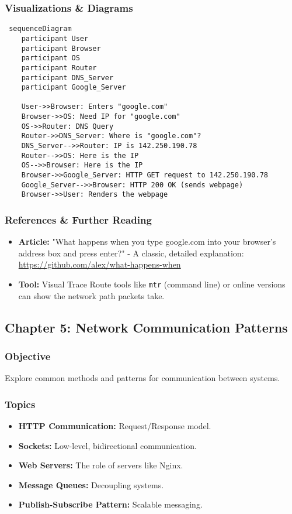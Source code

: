 \documentclass{article}
\begin{document}
\subsubsection{Visualizations \& Diagrams}
\begin{verbatim}
 sequenceDiagram
    participant User
    participant Browser
    participant OS
    participant Router
    participant DNS_Server
    participant Google_Server

    User->>Browser: Enters "google.com"
    Browser->>OS: Need IP for "google.com"
    OS->>Router: DNS Query
    Router->>DNS_Server: Where is "google.com"?
    DNS_Server-->>Router: IP is 142.250.190.78
    Router-->>OS: Here is the IP
    OS-->>Browser: Here is the IP
    Browser->>Google_Server: HTTP GET request to 142.250.190.78
    Google_Server-->>Browser: HTTP 200 OK (sends webpage)
    Browser->>User: Renders the webpage
\end{verbatim}

\subsubsection{References \& Further Reading}
\begin{itemize}
    \item \textbf{Article:} "What happens when you type google.com into your browser's address box and press enter?" - A classic, detailed explanation: \url{https://github.com/alex/what-happens-when}
    \item \textbf{Tool:} Visual Trace Route tools like \texttt{mtr} (command line) or online versions can show the network path packets take.
\end{itemize}

\subsection{Chapter 5: Network Communication Patterns}
\subsubsection{Objective}
Explore common methods and patterns for communication between systems.

\subsubsection{Topics}
\begin{itemize}
    \item \textbf{HTTP Communication:} Request/Response model.
    \item \textbf{Sockets:} Low-level, bidirectional communication.
    \item \textbf{Web Servers:} The role of servers like Nginx.
    \item \textbf{Message Queues:} Decoupling systems.
    \item \textbf{Publish-Subscribe Pattern:} Scalable messaging.
\end{itemize}
\end{document}

